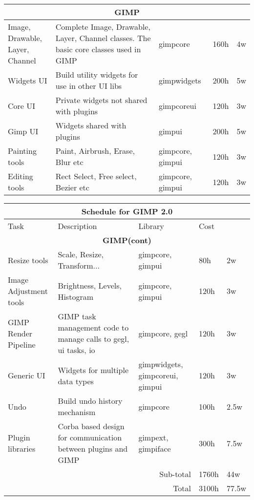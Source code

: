 \begin{flushleft}
\begin{tabular}{|p{2cm}|p{5cm}|p{2cm}|ll|}
\multicolumn{5}{|c|}{\bf GIMP}\\
\hline 
\raggedright{Image, Drawable,\\ Layer, Channel} & Complete Image,
Drawable, Layer, Channel classes. The basic core classes used in GIMP
& gimpcore & 160h & 4w\\
\hline 
Widgets UI & Build utility widgets for use in other UI libs  &
gimpwidgets & 200h & 5w\\
\hline
Core UI & Private widgets not shared with plugins & gimpcoreui & 120h
& 3w\\
\hline
Gimp UI & Widgets shared with plugins & gimpui & 200h & 5w\\
\hline 
Painting tools & Paint, Airbrush, Erase, Blur etc & gimpcore, gimpui &
120h & 3w\\
\hline 
\raggedright{Editing \\tools} & Rect Select, Free select, Bezier etc &
gimpcore, gimpui & 120h & 3w\\
\hline 
\end{tabular}

\begin{tabular}{|p{2cm}|p{5cm}|p{2cm}|ll|}\hline
\multicolumn{5}{|c|}{\rule[-3mm]{0mm}{8mm} \large \bf Schedule for GIMP 2.0}\\  
\hline
Task & Description & Library & \multicolumn{2}{|l|}{Cost}\\ 
\hline 
\multicolumn{5}{|c|}{\bf GIMP(cont)}\\
\hline 
Resize tools & Scale, Resize, Transform... & gimpcore, gimpui & 80h &
2w\\
\hline 
\raggedright{Image\\ Adjustment tools} & Brightness, Levels, Histogram
& gimpcore, gimpui & 120h & 3w\\
\hline
\raggedright{GIMP\\ Render Pipeline} & GIMP task management code to
manage calls to gegl, ui tasks, io & gimpcore, gegl & 120h & 3w\\
\hline 
Generic UI & Widgets for multiple data types & gimpwidgets,
gimpcoreui, gimpui & 120h & 3w\\
\hline
Undo & Build undo history mechanism & gimpcore & 100h & 2.5w\\
\hline
\raggedright{Plugin\\libraries} & Corba based design for communication
between plugins and GIMP & gimpext, gimpiface & 300h & 7.5w\\
\hline
\multicolumn{3}{|r|}{Sub-total} & 1760h & 44w\\
\hline

\multicolumn{3}{|r|}{Total} & 3100h & 77.5w\\
\hline
\end{tabular}
\end{flushleft}

	
